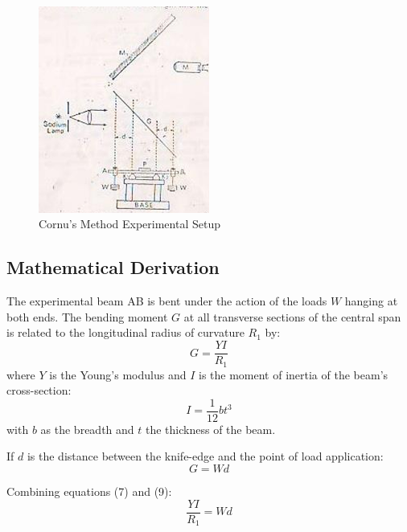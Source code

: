\documentclass[a4paper,11pt]{article}
\begin{document}
\vspace{1em}
\begin{figure}[h]
    \centering
    \includegraphics[width=0.5\textwidth]{draw.png}  %
    \caption{Cornu's Method Experimental Setup}
\end{figure}
\vspace{1em}

\subsection{Mathematical Derivation \autocite{IITRCornuMethod}}
\noindent

The experimental beam AB is bent under the action of the loads \( W \) hanging at both ends. The bending moment \( G \) at all transverse sections of the central span is related to the longitudinal radius of curvature \( R_1 \) by:
\begin{equation}
G = \frac{YI}{R_1}
\end{equation}
where \( Y \) is the Young's modulus and \( I \) is the moment of inertia of the beam's cross-section:
\begin{equation}
I = \frac{1}{12}bt^3
\end{equation}
with \( b \) as the breadth and \( t \) the thickness of the beam.

If \( d \) is the distance between the knife-edge and the point of load application:
\begin{equation}
G = Wd
\end{equation}

Combining equations (7) and (9):
\begin{equation}
\frac{YI}{R_1} = Wd
\end{equation}
\end{document}
